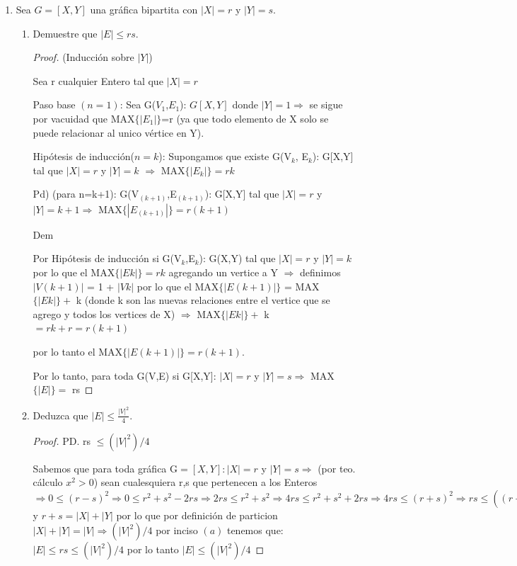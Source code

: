 \documentclass{article}
\begin{document}
\begin{enumerate}
\item Sea $G = [X, Y]$ una gr\'afica bipartita con $|X| = r$ y $|Y| = s$.
  \begin{enumerate}
  \item Demuestre que $|E| \le rs$.
\begin{proof}
  (Inducción sobre $|Y|$) 
  
  Sea r cualquier Entero tal que $|X|=r$
  
  Paso base $(n = 1)$: Sea G($V_1$,$E_1$): $G[X,Y]$ donde $|Y|=1\Longrightarrow$  se sigue por vacuidad que MAX$\{|E_1|\}$=r (ya que todo elemento de X solo se puede relacionar al unico vértice  en Y). 
  
  Hipótesis de inducción($ n = k$): Supongamos que existe G(V$_k$, E$_k$): G[X,Y] tal que $|X|=r$ y $|Y|= k$ $\Longrightarrow$ MAX$\{|E_k|\} = rk$
  
  Pd) (para n=k+1): G(V$_{(k+1)}$,E$_{(k+1)}$): G[X,Y] tal que $|X|=r$ y $|Y|=k+1 \Longrightarrow$ 
  MAX$\{|E_{(k+1)}|\} = r(k+1)$
  
  Dem
  
  Por Hipótesis de inducción si G(V$_k$,E$_k$): G(X,Y) tal que $|X|=r$ y $|Y|=k$ por lo que 
  el MAX$\{|Ek|\}=rk $ agregando un vertice a Y $\Longrightarrow$ definimos $|V(k+1)|$ = 1 + $|Vk|$ por lo que el MAX$\{|E(k+1)|\}$ = MAX$\{|Ek|\} + $ k (donde k son las nuevas relaciones entre el vertice que se agrego y todos los vertices de X) $\Longrightarrow$ MAX$\{|Ek|\} + $ k $= rk +r = r(k+1)$
  
  por lo tanto el MAX$\{|E(k+1)|\} = r(k+1)$.
  
  Por lo tanto, para toda G(V,E) si G[X,Y]: $|X|=r$ y $|Y|=s \Longrightarrow$ MAX$\{|E|\} =$ rs
  \end{proof}
  \item Deduzca que $|E| \le \frac{|V|^2}{4}$.
\begin{proof}
  PD. rs $ \leqslant (|V|^2)/4$
  
  Sabemos que para toda gráfica G$=[X,Y]: |X|=r$ y $|Y|=s \Longrightarrow$ (por teo. cálculo $x^2 > 0$) sean cualesquiera r,s que pertenecen a los Enteros  $\Longrightarrow  0 \leqslant (r-s)^2  \Longrightarrow 0   \leqslant r^2 + s^2 -2rs \Longrightarrow 2rs \leqslant r^2 + s^2 \Longrightarrow 4rs \leqslant r^2 + s^2 + 2rs \Longrightarrow 4rs \leqslant (r+s)^2 \Longrightarrow rs \leqslant ((r+s)^2)/4 $ y $r+s = |X|+|Y|$ por lo que por definición de particion $|X| + |Y| = |V|  \Longrightarrow (|V|^2)/4$ por inciso $(a)$ tenemos que:  $|E|\leqslant rs \leqslant (|V|^2)/4$
   por lo tanto $ |E|\leqslant (|V|^2)/4 $ 
  

\end{proof}
\end{enumerate}
\end{enumerate}
\end{document}
